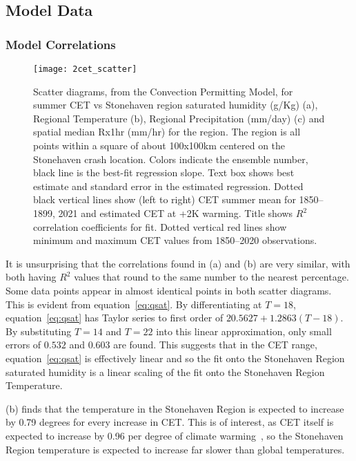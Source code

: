 \subsection{Model Data}\label{subsec:modelcorr}

\subsubsection{Model Correlations}

\begin{figure}[H]
    \centering
    \texttt{[image: 2cet\_scatter]}
    \caption{Scatter diagrams, from the Convection Permitting Model,
        for summer CET vs Stonehaven region saturated humidity (g/Kg) (a),
        Regional Temperature (b),
        Regional  Precipitation (mm/day) (c) and
        spatial median Rx1hr (mm/hr) for the region.
    The region is all points within a square of about 100x100km centered on the Stonehaven crash location.
    Colors indicate the ensemble number, black line is the best-fit regression slope.
    Text box shows best estimate and standard error in the estimated regression.
    Dotted black vertical lines show (left to right) CET summer mean for 1850--1899, 2021 and estimated CET at +2K warming.
    Title shows $R^2$ correlation coefficients for fit.
    Dotted vertical red lines show minimum and maximum CET values from 1850--2020 observations.}
    \label{fig:2cet_scatter}
\end{figure}

It is unsurprising that the correlations found in (a) and (b) are very similar,
    with both having $R^2$ values that round to the same number to the nearest percentage.
Some data points appear in almost identical points in both scatter diagrams.
This is evident from equation~\ref{eq:qsat}.
By differentiating at $T=18$,
    equation~\ref{eq:qsat} has Taylor series to first order of $20.5627+1.2863(T-18)$.
By substituting $T=14$ and $T=22$ into this linear approximation,
    only small errors of $0.532$ and $0.603$ are found.
This suggests that in the CET range, equation~\ref{eq:qsat} is effectively linear and so the fit onto the Stonehaven Region saturated humidity
    is a linear scaling of the fit onto the Stonehaven Region Temperature.

(b) finds that the temperature in the Stonehaven Region is expected to increase by 0.79 degrees for every increase
    in CET.
This is of interest, as CET itself is expected to increase by 0.96 per degree of climate warming~\cite{Tett_Soon},
    so the Stonehaven Region temperature is expected to increase far slower than global temperatures.

